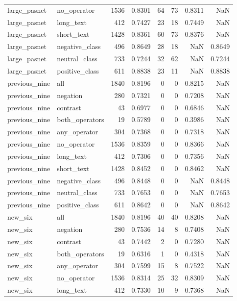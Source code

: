 \begin{tabular}{llrrrrrr}
large\_pasnet & no\_operator & 1536 & 0.8301 & 64 & 73 & 0.8311 & NaN \\
large\_pasnet & long\_text & 412 & 0.7427 & 23 & 18 & 0.7449 & NaN \\
large\_pasnet & short\_text & 1428 & 0.8361 & 60 & 73 & 0.8376 & NaN \\
large\_pasnet & negative\_class & 496 & 0.8649 & 28 & 18 & NaN & 0.8649 \\
large\_pasnet & neutral\_class & 733 & 0.7244 & 32 & 62 & NaN & 0.7244 \\
large\_pasnet & positive\_class & 611 & 0.8838 & 23 & 11 & NaN & 0.8838 \\
previous\_nine & all & 1840 & 0.8196 & 0 & 0 & 0.8215 & NaN \\
previous\_nine & negation & 280 & 0.7321 & 0 & 0 & 0.7208 & NaN \\
previous\_nine & contrast & 43 & 0.6977 & 0 & 0 & 0.6846 & NaN \\
previous\_nine & both\_operators & 19 & 0.5789 & 0 & 0 & 0.3986 & NaN \\
previous\_nine & any\_operator & 304 & 0.7368 & 0 & 0 & 0.7318 & NaN \\
previous\_nine & no\_operator & 1536 & 0.8359 & 0 & 0 & 0.8366 & NaN \\
previous\_nine & long\_text & 412 & 0.7306 & 0 & 0 & 0.7356 & NaN \\
previous\_nine & short\_text & 1428 & 0.8452 & 0 & 0 & 0.8462 & NaN \\
previous\_nine & negative\_class & 496 & 0.8448 & 0 & 0 & NaN & 0.8448 \\
previous\_nine & neutral\_class & 733 & 0.7653 & 0 & 0 & NaN & 0.7653 \\
previous\_nine & positive\_class & 611 & 0.8642 & 0 & 0 & NaN & 0.8642 \\
new\_six & all & 1840 & 0.8196 & 40 & 40 & 0.8208 & NaN \\
new\_six & negation & 280 & 0.7536 & 14 & 8 & 0.7408 & NaN \\
new\_six & contrast & 43 & 0.7442 & 2 & 0 & 0.7280 & NaN \\
new\_six & both\_operators & 19 & 0.6316 & 1 & 0 & 0.4318 & NaN \\
new\_six & any\_operator & 304 & 0.7599 & 15 & 8 & 0.7522 & NaN \\
new\_six & no\_operator & 1536 & 0.8314 & 25 & 32 & 0.8309 & NaN \\
new\_six & long\_text & 412 & 0.7330 & 10 & 9 & 0.7368 & NaN \\

\end{tabular}
